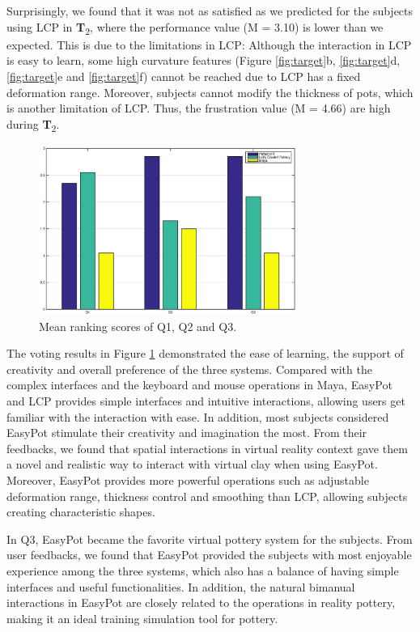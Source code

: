 \documentclass{svjour3}                     %
\begin{document}
Surprisingly, we found that it was not as satisfied as we predicted for the subjects using LCP in \textbf{T}\textsubscript{2}, where the performance value (M = 3.10) is lower than we expected. This is due to the limitations in LCP: Although the interaction in LCP is easy to learn, some high curvature features (Figure \ref{fig:target}b, \ref{fig:target}d, \ref{fig:target}e and \ref{fig:target}f) cannot be reached due to LCP has a fixed deformation range. Moreover, subjects cannot modify the thickness of pots, which is another limitation of LCP. Thus, the frustration value (M = 4.66) are high during \textbf{T}\textsubscript{2}.

\begin{figure}
	\includegraphics[width=0.75\textwidth]{ranking.eps}
	\caption{Mean ranking scores of Q1, Q2 and Q3.}
	\label{fig:ranking}
\end{figure}

The voting results in Figure \ref{fig:ranking} demonstrated the ease of learning, the support of creativity and overall preference of the three systems.
Compared with the complex interfaces and the keyboard and mouse operations in Maya, EasyPot and LCP provides simple interfaces and intuitive interactions, allowing users get familiar with the interaction with ease.
In addition, most subjects considered EasyPot stimulate their creativity and imagination the most. From their feedbacks, we found that spatial interactions in virtual reality context gave them a novel and realistic way to interact with virtual clay when using EasyPot. Moreover, EasyPot provides more powerful operations such as adjustable deformation range, thickness control and smoothing than LCP, allowing subjects creating characteristic shapes.

In Q3, EasyPot became the favorite virtual pottery system for the subjects. From user feedbacks, we found that EasyPot provided the subjects with most enjoyable experience among the three systems, which also has a balance of having simple interfaces and useful functionalities. In addition, the natural bimanual interactions in EasyPot are closely related to the operations in reality pottery, making it an ideal training simulation tool for pottery.
\end{document}
